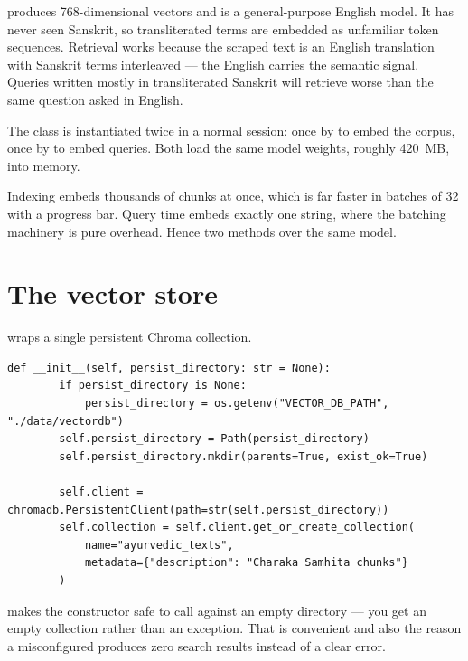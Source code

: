  produces 768-dimensional vectors and is a general-purpose English model. It has never seen Sanskrit, so transliterated terms are embedded as unfamiliar token sequences. Retrieval works because the scraped text is an English translation with Sanskrit terms interleaved --- the English carries the semantic signal. Queries written mostly in transliterated Sanskrit will retrieve worse than the same question asked in English.

The class is instantiated twice in a normal session: once by  to embed the corpus, once by  to embed queries. Both load the same model weights, roughly 420~MB, into memory.

\begin{note}[title={Why \code{embed\_batch} exists separately}]
Indexing embeds thousands of chunks at once, which is far faster in batches of 32 with a progress bar. Query time embeds exactly one string, where the batching machinery is pure overhead. Hence two methods over the same model.
\end{note}

\section{The vector store}

 wraps a single persistent Chroma collection.

\begin{lstlisting}[style=py,firstnumber=9]
    def __init__(self, persist_directory: str = None):
        if persist_directory is None:
            persist_directory = os.getenv("VECTOR_DB_PATH", "./data/vectordb")
        self.persist_directory = Path(persist_directory)
        self.persist_directory.mkdir(parents=True, exist_ok=True)

        self.client = chromadb.PersistentClient(path=str(self.persist_directory))
        self.collection = self.client.get_or_create_collection(
            name="ayurvedic_texts",
            metadata={"description": "Charaka Samhita chunks"}
        )
\end{lstlisting}

 makes the constructor safe to call against an empty directory --- you get an empty collection rather than an exception. That is convenient and also the reason a misconfigured  produces zero search results instead of a clear error.

